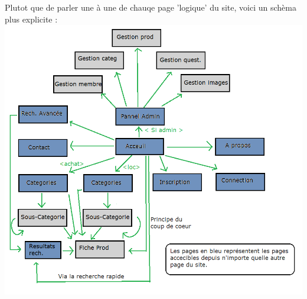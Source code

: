 Plutot que de parler une à une de chauqe page 'logique' du site, voici un schèma plus explicite :\\

\includegraphics[scale=0.5]{Images/arbo.png}


